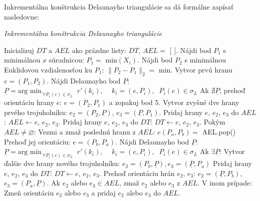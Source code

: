 \documentclass[11pt]{article}
\begin{document}
\noindent Inkrementálna konštrukcia Delaunayho triangulácie sa dá formálne zapísať nasledovne: 
\begin{algorithm}
    \caption {\textit{Inkrementálna konštrukcia Delaunayho triangulácie}}
    \begin{algorithmic}[1]
        \State Inicializuj $DT$ a $AEL$ ako prázdne listy: $DT$, $AEL =$ [ ].
        \State Nájdi bod $P_1$ s minimálnou $x$ súradnicou: $P_1 =$ min$(X_i)$.
        \State Nájdi bod $P_2$ s minimálnou Euklidovou vzdialenosťou ku $P_1$: 	$\|P_2 - P_1\|_2 =$ min. 
        \State Vytvor prvú hranu $e = (P_1, P_2)$.
        \State Nájdi Delaunayho bod $\underline{P}$: $\underline{P} = \text{arg min}_{\, \forall P_i(e) \in \sigma_L} \; \; r'(k_i), \quad \, k_i = (e, P_i), \; \; P_i(e) \in \sigma_L$
        \State Ak $\nexists \underline{P}$, prehoď orientáciu hrany $e$: $e = (P_2, P_1)$ a zopakuj bod 5.
        \State Vytvor zvyšné dve hrany prvého trojuholníku: $e_2 = (P_2, \underline{P})$, $e_3 = (\underline{P}, P_1)$.
        \State Pridaj hrany $e$, $e_2$, $e_3$ do $AEL$: $AEL \gets e$, $e_2$, $e_3$.
        \State Pridaj hrany $e$, $e_2$, $e_3$ do $DT$: $DT \gets e$, $e_2$, $e_3$.
        \State Pokým $AEL \ne \varnothing$:
        \State \indent Vezmi a zmaž poslednú hranu z $AEL$: $e(P_a, P_b) = $ AEL.pop()
        \State \indent Prehoď jej orientáciu: $e = (P_b, P_a)$.
        \State \indent Nájdi Delaunayho bod $\underline{P}$: $\underline{P} = \text{arg min}_{\, \forall P_i(e) \in \sigma_L} \; \; r'(k_i), \quad \, k_i = (e, P_i), \; \; P_i(e) \in \sigma_L$
        \State \indent Ak $\exists \underline{P}$:
        \State \indent \indent Vytvor ďalšie dve hrany nového trojuholníku: $e_2 = (P_b, \underline{P}), e_3 = (\underline{P}, P_a)$
        \State \indent \indent Pridaj hrany $e$, $e_2$, $e_3$ do $DT$: $DT \gets e$, $e_2$, $e_3$.
        \State \indent \indent Prehoď orientáciu hrán $e_2$, $e_3$: $e_2 = (\underline{P}, P_b)$, $e_3 = (P_a, \underline{P})$.
        \State \indent \indent Ak $e_2$ alebo $e_3 \in AEL$, zmaž $e_2$ alebo $e_3$ z $AEL$.
        \State \indent \indent V inom prípade: Zmeň orientáciu $e_2$ alebo $e_3$ a pridaj $e_2$ alebo $e_3$ do $AEL$.
    \end{algorithmic}
\end{algorithm}
\end{document}
